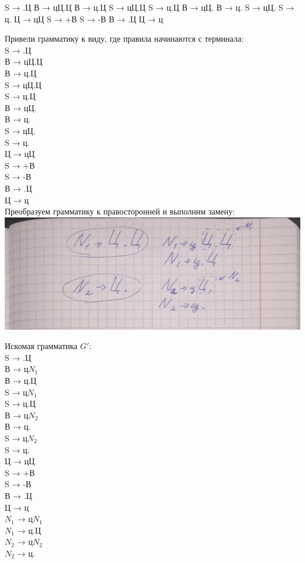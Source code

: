 \documentclass[a4paper,14pt]{extarticle}
\begin{document}
S → .Ц
В → цЦ.Ц
В → ц.Ц
S → цЦ.Ц
S → ц.Ц
В → цЦ.
В → ц.
S → цЦ.
S → ц.
Ц → цЦ
S → +В
S → -В
В → .Ц
Ц → ц
\fi

Привели грамматику к виду, где правила начинаются с терминала:\\

S → .Ц\\
В → цЦ.Ц\\
В → ц.Ц\\
S → цЦ.Ц\\
S → ц.Ц\\
В → цЦ.\\
В → ц.\\
S → цЦ.\\
S → ц.\\
Ц → цЦ\\
S → +В\\
S → -В\\
В → .Ц\\
Ц → ц\\

Преобразуем грамматику к правосторонней и выполним замену:\\

\includegraphics[width=140mm]{answer_dec}

Искомая грамматика $G'$:\\
S → .Ц\\
В → ц$N_1$\\
В → ц.Ц\\
S → ц$N_1$\\
S → ц.Ц\\
В → ц$N_2$\\
В → ц.\\
S → ц$N_2$\\
S → ц.\\
Ц → цЦ\\
S → +В\\
S → -В\\
В → .Ц\\
Ц → ц\\
$N_1$ → ц$N_1$\\
$N_1$ → ц.Ц\\
$N_2$ → ц$N_2$\\
$N_2$ → ц.\\
\end{document}
